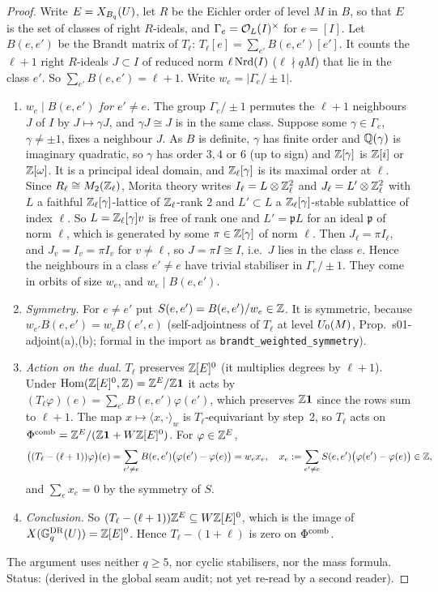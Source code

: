 \begin{proof}
Write $E=X_{B_q}(U)$, let $R$ be the Eichler order of level $M$ in $B$, so that $E$ is the set of classes of right $R$-ideals, and
$\Gamma_e=\mathcal{O}_L(I)^\times$ for $e=[I]$. Let $B(e,e')$ be the Brandt matrix of $T_\ell$: $T_\ell[e]=\sum_{e'}B(e,e')[e']$. It counts
the $\ell+1$ right $R$-ideals $J\subset I$ of reduced norm $\ell\,\mathrm{Nrd}(I)$ ($\ell\nmid qM$) that lie in the class $e'$. So
$\sum_{e'}B(e,e')=\ell+1$. Write $w_e=|\Gamma_e/\pm1|$.
\begin{enumerate}[label=(\arabic*)]
\item \emph{$w_e\mid B(e,e')$ for $e'\ne e$.} The group $\Gamma_e/\pm1$ permutes the $\ell+1$ neighbours $J$ of $I$ by $J\mapsto\gamma J$,
  and $\gamma J\cong J$ is in the same class. Suppose some $\gamma\in\Gamma_e$, $\gamma\ne\pm1$, fixes a neighbour $J$. As $B$ is
  definite, $\gamma$ has finite order and $\mathbb{Q}(\gamma)$ is imaginary quadratic, so $\gamma$ has order $3,4$ or $6$ (up to sign) and $\mathbb{Z}[\gamma]$ is
  $\mathbb{Z}[i]$ or $\mathbb{Z}[\omega]$. It is a principal ideal domain, and $\mathbb{Z}_\ell[\gamma]$ is its maximal order at $\ell$. Since $R_\ell\cong M_2(\mathbb{Z}_\ell)$,
  Morita theory writes $I_\ell=L\otimes\mathbb{Z}_\ell^2$ and $J_\ell=L'\otimes\mathbb{Z}_\ell^2$ with $L$ a faithful $\mathbb{Z}_\ell[\gamma]$-lattice of
  $\mathbb{Z}_\ell$-rank $2$ and $L'\subset L$ a $\mathbb{Z}_\ell[\gamma]$-stable sublattice of index $\ell$. So $L=\mathbb{Z}_\ell[\gamma]v$ is free of rank one
  and $L'=\mathfrak pL$ for an ideal $\mathfrak p$ of norm $\ell$, which is generated by some $\pi\in\mathbb{Z}[\gamma]$ of norm $\ell$. Then $J_\ell=\pi I_\ell$,
  and $J_v=I_v=\pi I_v$ for $v\ne\ell$, so $J=\pi I\cong I$, i.e.\ $J$ lies in the class $e$. Hence the neighbours in a class $e'\ne e$ have
  trivial stabiliser in $\Gamma_e/\pm1$. They come in orbits of size $w_e$, and $w_e\mid B(e,e')$.
\item \emph{Symmetry.} For $e\ne e'$ put $S(e,e')=B(e,e')/w_e\in\mathbb{Z}$. It is symmetric, because $w_{e'}B(e,e')=w_eB(e',e)$
  (self-adjointness of $T_\ell$ at level $U_0(M)$, Prop.~s01-adjoint(a),(b); formal in the import as \texttt{brandt\_weighted\_symmetry}).
\item \emph{Action on the dual.} $T_\ell$ preserves $\mathbb{Z}[E]^0$ (it multiplies degrees by $\ell+1$). Under $\operatorname{Hom}(\mathbb{Z}[E]^0,\mathbb{Z})=\mathbb{Z}^E/\mathbb{Z}\mathbf1$ it
  acts by $(T_\ell\varphi)(e)=\sum_{e'}B(e,e')\varphi(e')$, which preserves $\mathbb{Z}\mathbf1$ since the rows sum to $\ell+1$. The map
  $x\mapsto\langle x,\cdot\rangle_w$ is $T_\ell$-equivariant by step~2, so $T_\ell$ acts on $\Phi^{\mathrm{comb}}=\mathbb{Z}^E/(\mathbb{Z}\mathbf1+W\mathbb{Z}[E]^0)$. For $\varphi\in\mathbb{Z}^E$,
  \[\big((T_\ell-(\ell+1))\varphi\big)(e)=\sum_{e'\ne e}B(e,e')\big(\varphi(e')-\varphi(e)\big)=w_ex_e,\quad
  x_e:=\sum_{e'\ne e}S(e,e')\big(\varphi(e')-\varphi(e)\big)\in\mathbb{Z},\]
  and $\sum_ex_e=0$ by the symmetry of $S$.
\item \emph{Conclusion.} So $(T_\ell-(\ell+1))\mathbb{Z}^E\subseteq W\mathbb{Z}[E]^0$, which is the image of $X(\mathbb{G}^{\mathrm{DR}}_q(U))=\mathbb{Z}[E]^0$. Hence $T_\ell-(1+\ell)$ is zero on $\Phi^{\mathrm{comb}}$.
\end{enumerate}
The argument uses neither $q\ge5$, nor cyclic stabilisers, nor the mass formula. Status: \stproved{} (derived in the global seam audit; not yet re-read by a second reader).
\end{proof}

